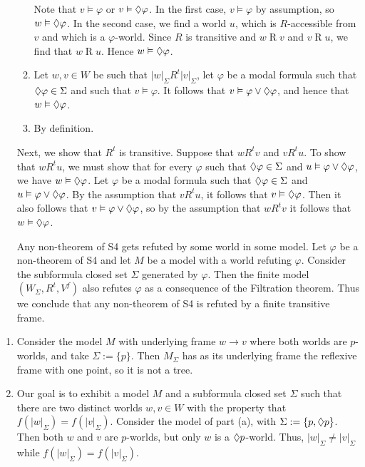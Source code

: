 \documentclass{article}
\begin{document}
\begin{ex}
\begin{enumerate}
\begin{enumerate}
Note that $v\models \varphi$ or $v\vDash\lozenge\varphi$.
In the first case, $v\models\varphi$ by assumption, so $w\vDash\lozenge\varphi$. 
In the second case, we find
a world $u$, which is $R$-accessible from $v$ and which is a $\varphi$-world.
Since $R$ is transitive and $w\mathbin{R} v$ and $v\mathbin{R} u$, we find that
$w\mathbin{R} u$. Hence $w\vDash\lozenge\varphi$.
\item Let $w,v\in W$ be such that $|w|_\Sigma\mathbin{R^t}|v|_\Sigma$, let
$\varphi$ be a modal formula such that $\lozenge\varphi\in\Sigma$ and such that
$v\models\varphi$. It follows that $v\vDash\varphi\lor\lozenge\varphi$, and hence
that $w\vDash\lozenge\varphi$. 
\item By definition.
\end{enumerate}
Next, we show that $R^t$ is transitive. Suppose that $w\mathbin{R^t}v$ and
$v\mathbin{R^t} u$. To show that $w\mathbin{R^t} u$, we must show that for every
$\varphi$ such that $\lozenge\varphi\in\Sigma$ and $u\vDash\varphi\lor\lozenge\varphi$,
we have $w\vDash\lozenge\varphi$. Let $\varphi$ be a modal formula such that
$\lozenge\varphi\in\Sigma$ and $u\vDash\varphi\lor\lozenge\varphi$. By the assumption
that $v\mathbin{R^t} u$, it follows that $v\vDash\lozenge\varphi$. Then it also
follows that $v\vDash\varphi\lor\lozenge\varphi$, so by the assumption that
$w\mathbin{R^t} v$ it follows that $w\vDash\lozenge\varphi$.

Any non-theorem of \textsf{S4} gets refuted by some world in some model. Let
$\varphi$ be a non-theorem of \textsf{S4} and let $M$ be a model with a world
refuting $\varphi$. Consider the subformula closed set $\Sigma$ generated by
$\varphi$. Then the finite model $(W_\Sigma,R^t,V^f)$ also refutes $\varphi$ as a consequence
of the Filtration theorem. Thus we conclude that any non-theorem of
\textsf{S4} is refuted by a finite transitive frame. 
\end{enumerate}
\end{ex}

\begin{ex}
\begin{enumerate}
\item Consider the model $M$ with underlying frame $w\to v$ where both 
worlds are $p$-worlds, and take $\Sigma:=\{p\}$. Then $M_\Sigma$ has as its
underlying frame the reflexive frame with one point, so it is not a tree.
\item Our goal is to exhibit a model $M$ and a subformula closed set $\Sigma$
such that there are two distinct worlds $w,v\in W$ with the property that
$f(|w|_\Sigma)=f(|v|_\Sigma)$. Consider the model of part (a), with
$\Sigma:=\{p,\lozenge p\}$. Then both $w$ and $v$ are $p$-worlds, but only
$w$ is a $\lozenge p$-world. Thus, $|w|_\Sigma\neq |v|_\Sigma$ while
$f(|w|_\Sigma)=f(|v|_\Sigma)$.
\end{enumerate}
\end{ex}
\end{document}
